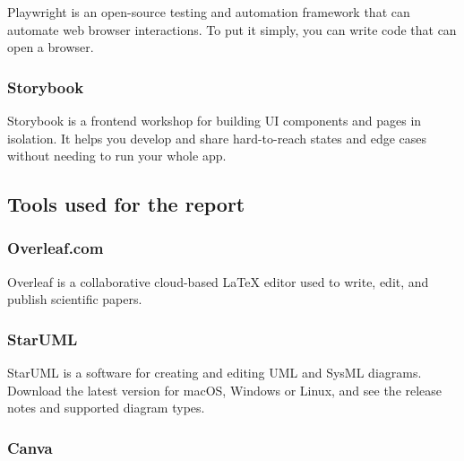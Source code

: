 Playwright is an open-source testing and automation framework that can automate web browser interactions. To put it simply, you can write code that can open a browser.

\subsubsection*{\protect{} Storybook}

Storybook is a frontend workshop for building UI components and pages in isolation. It helps you develop and share hard-to-reach states and edge cases without needing to run your whole app.

\subsection{Tools used for the report}

\subsubsection*{Overleaf.com}

Overleaf is a collaborative cloud-based LaTeX editor used to write, edit, and publish scientific papers.

\subsubsection*{StarUML}

StarUML is a software for creating and editing UML and SysML diagrams. Download the latest version for macOS, Windows or Linux, and see the release notes and supported diagram types.

\subsubsection*{Canva}

